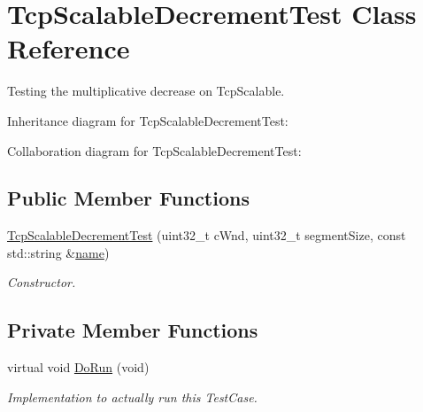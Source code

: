 \hypertarget{classTcpScalableDecrementTest}{}\section{Tcp\+Scalable\+Decrement\+Test Class Reference}
\label{classTcpScalableDecrementTest}


Testing the multiplicative decrease on Tcp\+Scalable.  




Inheritance diagram for Tcp\+Scalable\+Decrement\+Test\+:


Collaboration diagram for Tcp\+Scalable\+Decrement\+Test\+:
\subsection*{Public Member Functions}
\begin{DoxyCompactItemize}
\item 
\hyperlink{classTcpScalableDecrementTest_a889bbd417b2bc114bd90ba1e68c1b029}{Tcp\+Scalable\+Decrement\+Test} (uint32\+\_\+t c\+Wnd, uint32\+\_\+t segment\+Size, const std\+::string \&\hyperlink{generate__test__data__lte__spectrum__model_8m_ab74e6bf80237ddc4109968cedc58c151}{name})
\begin{DoxyCompactList}\small\item\em Constructor. \end{DoxyCompactList}\end{DoxyCompactItemize}
\subsection*{Private Member Functions}
\begin{DoxyCompactItemize}
\item 
virtual void \hyperlink{classTcpScalableDecrementTest_a1b770903f1998367eb686ec17fceb9bb}{Do\+Run} (void)
\begin{DoxyCompactList}\small\item\em Implementation to actually run this Test\+Case. \end{DoxyCompactList}\end{DoxyCompactItemize}
